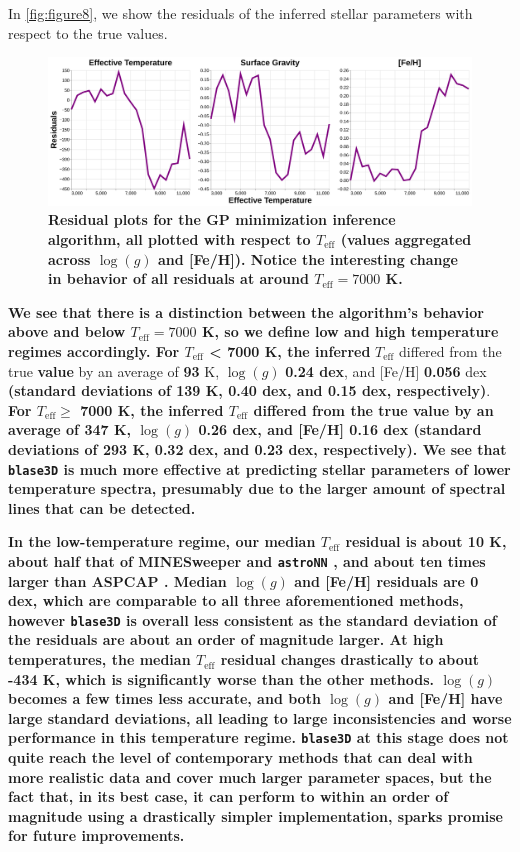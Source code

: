 \documentclass[twocolumn, linenumbers]{aastex631}
\begin{document}
In \autoref{fig:figure8}, we show the residuals of the inferred stellar parameters with respect to the true values.
\begin{figure}
    \centering
    \includegraphics[width=\textwidth]{figure8}
    \caption{\textbf{Residual plots for the GP minimization inference algorithm, all plotted with respect to $T_\text{eff}$ (values aggregated across $\log(g)$ and [Fe/H]).
    Notice the interesting change in behavior of all residuals at around $T_\text{eff} = 7000$ K.}}
    \label{fig:figure8}
\end{figure}
\textbf{We see that there is a distinction between the algorithm's behavior above and below $T_{\mathrm{eff}} = 7000$ K, so we define low and high temperature regimes accordingly.
For $T_{\mathrm{eff}}$ < 7000 K, the inferred} $T_{\mathrm{eff}}$ differed from the true \textbf{value} by an average of \textbf{93} K, $\log(g)$ \textbf{0.24 dex}, and [Fe/H] \textbf{0.056} dex \textbf{(standard deviations of 139 K, 0.40 dex, and 0.15 dex, respectively)}.
\textbf{For $T_{\mathrm{eff}} \ge$ 7000 K, the inferred $T_{\mathrm{eff}}$ differed from the true value by an average of 347 K, $\log(g)$ 0.26 dex, and [Fe/H] 0.16 dex (standard deviations of 293 K, 0.32 dex, and 0.23 dex, respectively).
We see that \texttt{blase3D} is much more effective at predicting stellar parameters of lower temperature spectra, presumably due to the larger amount of spectral lines that can be detected.}

\textbf{In the low-temperature regime, our median $T_\text{eff}$ residual is about 10 K, about half that of MINESweeper \citep{minesweeper} and \texttt{astroNN} \citep{leung2019}, and about ten times larger than ASPCAP \citep{ASPCAP}.
Median $\log(g)$ and [Fe/H] residuals are 0 dex, which are comparable to all three aforementioned methods, however \texttt{blase3D} is overall less consistent as the standard deviation of the residuals are about an order of magnitude larger.
At high temperatures, the median $T_\text{eff}$ residual changes drastically to about -434 K, which is significantly worse than the other methods.
$\log(g)$ becomes a few times less accurate, and both $\log(g)$ and [Fe/H] have large standard deviations, all leading to large inconsistencies and worse performance in this temperature regime.
\texttt{blase3D} at this stage does not quite reach the level of contemporary methods that can deal with more realistic data and cover much larger parameter spaces, but the fact that, in its best case, it can perform to within an order of magnitude using a drastically simpler implementation, sparks promise for future improvements.}
\end{document}
